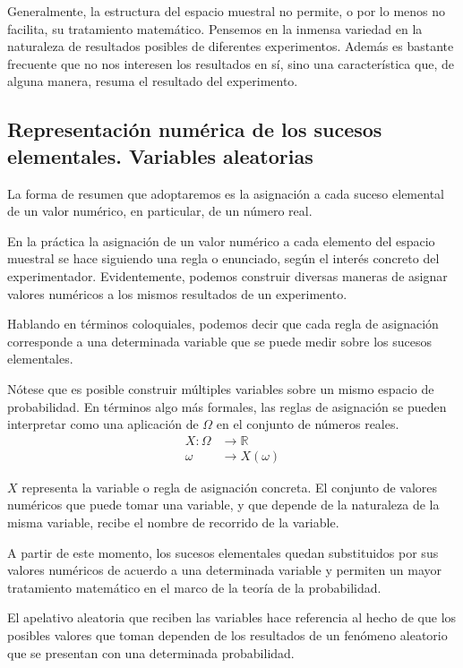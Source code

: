 \documentclass[
]{article}
\begin{document}
Generalmente, la estructura del espacio muestral no permite, o por lo
menos no facilita, su tratamiento matemático. Pensemos en la inmensa
variedad en la naturaleza de resultados posibles de diferentes
experimentos. Además es bastante frecuente que no nos interesen los
resultados en sí, sino una característica que, de alguna manera, resuma
el resultado del experimento.

\subsection{Representación numérica de los sucesos elementales. Variables aleatorias}\label{representaciuxf3n-numuxe9rica-de-los-sucesos-elementales.-variables-aleatorias}

La forma de resumen que adoptaremos es la asignación a cada suceso
elemental de un valor numérico, en particular, de un número real.

En la práctica la asignación de un valor numérico a cada elemento del
espacio muestral se hace siguiendo una regla o enunciado, según el
interés concreto del experimentador. Evidentemente, podemos construir
diversas maneras de asignar valores numéricos a los mismos resultados de
un experimento.

Hablando en términos coloquiales, podemos decir que cada regla de
asignación corresponde a una determinada variable que se puede medir
sobre los sucesos elementales.

Nótese que es posible construir múltiples variables sobre un mismo
espacio de probabilidad. En términos algo más formales, las reglas de
asignación se pueden interpretar como una aplicación de \(\Omega\) en el
conjunto de números reales. \[
\begin{aligned}
X: \Omega & \rightarrow \mathbb{R} \\
\omega & \rightarrow X(\omega)
\end{aligned}
\]

\(X\) representa la variable o regla de asignación concreta. El conjunto
de valores numéricos que puede tomar una variable, y que depende de la
naturaleza de la misma variable, recibe el nombre de recorrido de la
variable.

A partir de este momento, los sucesos elementales quedan substituidos
por sus valores numéricos de acuerdo a una determinada variable y
permiten un mayor tratamiento matemático en el marco de la teoría de la
probabilidad.

El apelativo aleatoria que reciben las variables hace referencia al
hecho de que los posibles valores que toman dependen de los resultados
de un fenómeno aleatorio que se presentan con una determinada
probabilidad.
\end{document}
